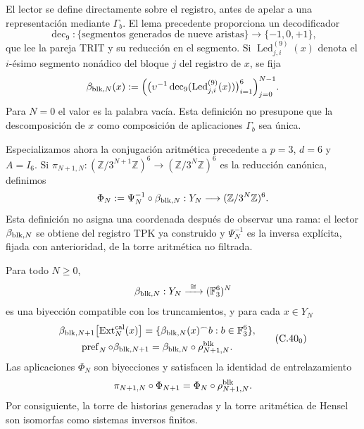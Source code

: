 El lector se define directamente sobre el registro, antes de apelar a una
representación mediante \(\Gamma_b\). El lema precedente proporciona un
decodificador
\[
 \operatorname{dec}_9:\{\text{segmentos generados de nueve aristas}\}
 \longrightarrow\{-1,0,+1\},
\]
que lee la pareja TRIT y su reducción en el segmento. Si
\(\operatorname{Led}^{(9)}_{j,i}(x)\) denota el \(i\)-ésimo segmento nonádico
del bloque \(j\) del registro de \(x\), se fija
\begin{equation}
 \beta_{{\rm blk},N}(x):=
 \Bigl(
   \bigl(\upsilon^{-1}\operatorname{dec}_9
          (\operatorname{Led}^{(9)}_{j,i}(x))\bigr)_{i=1}^{6}
 \Bigr)_{j=0}^{N-1}.
 \label{eq:lector-bloques-ch}
\end{equation}
Para \(N=0\) el valor es la palabra vacía. Esta definición no presupone que
la descomposición de \(x\) como composición de aplicaciones \(\Gamma_b\) sea
única.

Especializamos ahora la conjugación aritmética precedente a
\(p=3\), \(d=6\) y \(A=I_6\). Si
\(\pi_{N+1,N}:(\mathbb Z/3^{N+1}\mathbb Z)^6\to
(\mathbb Z/3^N\mathbb Z)^6\) es la reducción canónica, definimos
\begin{equation}
 \Phi_N:=\Psi_N^{-1}\circ\beta_{{\rm blk},N}:
 Y_N\longrightarrow(\mathbb Z/3^N\mathbb Z)^6.
 \label{eq:phi-hensel-bloques-ch}
\end{equation}
Esta definición no asigna una coordenada después de observar una rama: el
lector \(\beta_{{\rm blk},N}\) se obtiene del registro TPK ya construido y
\(\Psi_N^{-1}\) es la inversa explícita, fijada con anterioridad, de la torre
aritmética no filtrada.

\begin{proposition}
\label{prop:cobertura-729-seccion}
Para todo \(N\geq0\),
\[
 \beta_{{\rm blk},N}:Y_N\xrightarrow{\ \cong\ }
 (\mathbb F_3^6)^N
\]
es una biyección compatible con los truncamientos, y para cada \(x\in Y_N\)
\[
 \begin{gathered}
 \beta_{{\rm blk},N+1}
 \bigl[\operatorname{Ext}^{\rm cal}_N(x)\bigr]
 =\{\beta_{{\rm blk},N}(x)^\frown b:
       b\in\mathbb F_3^6\},\\
 \operatorname{pref}_N\circ\beta_{{\rm blk},N+1}
 =\beta_{{\rm blk},N}\circ\rho^{\rm blk}_{N+1,N}.
 \end{gathered}
\tag{C.40$_0$}
\label{eq:cobertura-729-ch}
\]
Las aplicaciones \(\Phi_N\) son biyecciones y satisfacen la identidad de
entrelazamiento
\begin{equation}
 \pi_{N+1,N}\circ\Phi_{N+1}
 =\Phi_N\circ\rho^{\rm blk}_{N+1,N}.
 \label{eq:entrelazamiento-hensel-ext-ch}
\end{equation}
Por consiguiente, la torre de historias generadas y la torre aritmética de
Hensel son isomorfas como sistemas inversos finitos.
\end{proposition}

